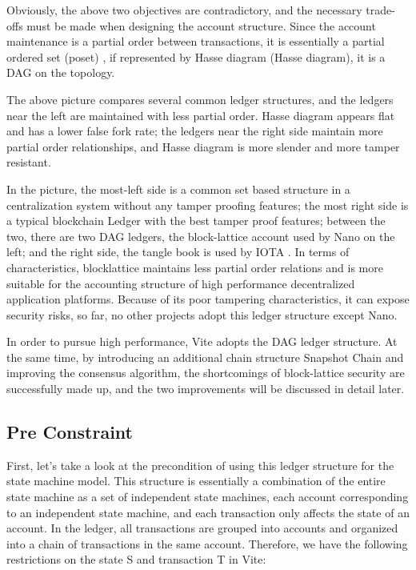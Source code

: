 \documentclass[UTF8,nofonts]{article}
\begin{document}
\begin{multicols}{2}
Obviously, the above two objectives are contradictory, and the necessary trade-offs must be made when designing the account structure. Since the account maintenance is a partial order between transactions, it is essentially a partial ordered set (poset) \cite{poset}, if represented by Hasse diagram (Hasse diagram)\cite{hasse}, it is a DAG on the topology.

The above picture compares several common ledger structures, and the ledgers near the left are maintained with less partial order. Hasse diagram appears flat and has a lower false fork rate; the ledgers near the right side maintain more partial order relationships, and Hasse diagram is more slender and more tamper resistant.

In the picture, the most-left side is a common set based structure in a centralization system without any tamper proofing features; the most right side is a typical blockchain Ledger with the best tamper proof features; between the two, there are two DAG ledgers,  the block-lattice account \cite{nano} used by Nano on the left; and the right side, the tangle book \cite{iota} is used by IOTA . In terms of characteristics, blocklattice maintains less partial order relations and is more suitable for the accounting structure of high performance decentralized application platforms. Because of its poor tampering characteristics, it can expose security risks, so far, no other projects adopt this ledger structure except Nano.

In order to pursue high performance, Vite adopts the DAG ledger structure.  At the same time, by introducing an additional chain structure Snapshot Chain and improving the consensus algorithm, the shortcomings of block-lattice security are successfully made up, and the two improvements will be discussed in detail later.

\subsection{Pre Constraint}
First, let's take a look at the precondition of using this ledger structure for the state machine model. This structure is essentially a combination of the entire state machine as a set of independent state machines, each account corresponding to an independent state machine, and each transaction only affects the state of an account. In the ledger, all transactions are grouped into accounts and organized into a chain of transactions in the same account. Therefore, we have the following restrictions on the state S and transaction T in Vite:


\end{multicols}
\end{document}
